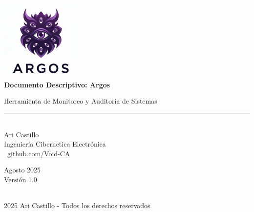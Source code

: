\begin{titlepage}
\thispagestyle{empty}
\centering
\pagecolor{white}
\color{textcolor}

\vspace*{2cm}

\includegraphics[width=0.3\textwidth]{images/logo-argos.png}\\[1cm]

{\Huge\bfseries{}\selectfont\color{purpledark} Documento Descriptivo: Argos\\[0.8cm]}

{\LARGE\color{purpleprimary} Herramienta de Monitoreo y Auditoría de Sistemas\\[1cm]}

{\color{purpleprimary}\rule{\textwidth}{1.5pt}}\\[1cm]

{\Large\color{textcolor} Ari Castillo\\[0.3cm]}
{\large\color{textcolor} Ingeniería Cibernetica Electrónica\\[0.3cm]}
{\large\color{purpleprimary} \faGithub\ \href{https://github.com/Void-CA}{github.com/Void-CA}\\[1.5cm]}

\begin{minipage}{0.6\textwidth}
  \centering
  {\large\color{textcolor} Agosto 2025\\[0.2cm]}
  {\large\color{textcolor} Versión 1.0\\[0.2cm]}
\end{minipage}\\[1.5cm]


{\small
\color{graylight}
 2025 Ari Castillo - Todos los derechos reservados
}
\end{titlepage}